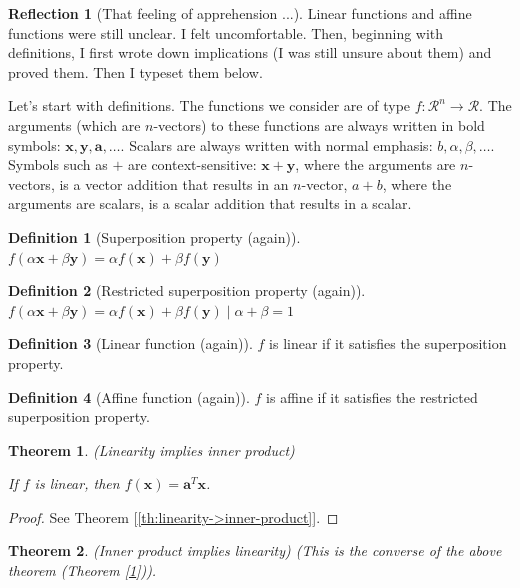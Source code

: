 \documentclass[11pt]{book}
\theoremstyle{definition}
\newtheorem{definition}{Definition}
\theoremstyle{plain}
\newtheorem{theorem}{Theorem}
\theoremstyle{problemstyle}
\theoremstyle{remark}
\theoremstyle{definition}
\newtheorem{reflection}{Reflection}
\begin{document}
\begin{reflection}[That feeling of apprehension ...]

    Linear functions and affine functions were still unclear. I felt uncomfortable. Then, beginning with definitions, I first wrote down implications (I was still unsure about them) and proved them. Then I typeset them below. 
    
    Let's start with definitions. The functions we consider are of type $f:\mathcal{R}^n\rightarrow\mathcal{R}$. The arguments (which are $n$-vectors) to these functions are always written in bold symbols: $\boldsymbol{x},\boldsymbol{y},\boldsymbol{a},\dots$. Scalars are always written with normal emphasis: $b,\alpha,\beta,\dots$. Symbols such as $+$ are context-sensitive: $\boldsymbol{x}+\boldsymbol{y}$, where the arguments are $n$-vectors, is a vector addition that results in an $n$-vector, $a+b$, where the arguments are scalars, is a scalar addition that results in a scalar.
    \begin{definition}[Superposition property (again)]
        \label{def:superposition-property-again}
        $f(\alpha\boldsymbol{x}+\beta\boldsymbol{y})=\alpha f(\boldsymbol{x})+\beta f(\boldsymbol{y})$
    \end{definition}
    \begin{definition}[Restricted superposition property (again)]
        \label{def:restricted-superposition-property-again}
        $f(\alpha\boldsymbol{x}+\beta\boldsymbol{y})=\alpha f(\boldsymbol{x})+\beta f(\boldsymbol{y})\mid\alpha+\beta=1$
    \end{definition}
    \begin{definition}[Linear function (again)]
        $f$ is linear if it satisfies the superposition property. 
    \end{definition}
    \begin{definition}[Affine function (again)]
        $f$ is affine if it satisfies the restricted superposition property. 
    \end{definition}

    \begin{theorem}(Linearity implies inner product)
        \label{th:linearity->inner-product-again}

        If $f$ is linear, then $f(\boldsymbol{x})=\boldsymbol{a}^T\boldsymbol{x}$.
    \end{theorem}
    \begin{proof}
        See Theorem [\ref{th:linearity->inner-product}].
    \end{proof}
    \begin{theorem}(Inner product implies linearity)
        \label{th:inner-product->linearity}
        (This is the converse of the above theorem (Theorem [\ref{th:linearity->inner-product-again}])).


\end{theorem}
\end{reflection}
\end{document}
